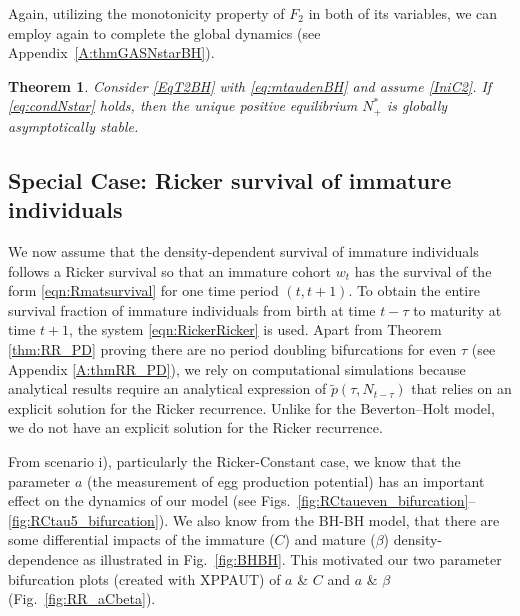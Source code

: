 \documentclass{article}
\newtheorem{theorem}{Theorem}
\numberwithin{theorem}{section}
\begin{document}
{Again, utilizing the monotonicity property of $F_{2}$ in both of its variables, we can employ again \cite[Theorem~1.15]{Ladas_2004} to complete the global dynamics (see Appendix~\ref{A:thmGASNstarBH}).

\begin{theorem}\label{thm:GASNstarBH}
      Consider \eqref{EqT2BH} with \eqref{eq:mtaudenBH} and assume \eqref{IniC2}. If \eqref{eq:condNstar} holds, then the unique positive equilibrium $N^*_+$ is globally asymptotically stable.
\end{theorem}

\subsection{Special Case: Ricker survival of immature individuals }

We now assume that the density-dependent survival of immature individuals follows a Ricker survival so that an immature cohort $w_t$ has the survival of the form \eqref{eqn:Rmatsurvival} for one time period $(t,t+1)$. To obtain the entire survival fraction of immature individuals from birth at time $t-\tau$ to maturity at time $t+1$, the system \eqref{eqn:RickerRicker} is used. Apart from Theorem \ref{thm:RR_PD} proving there are no period doubling bifurcations for even $\tau$ (see Appendix \ref{A:thmRR_PD}), we rely on computational simulations because analytical results require an analytical expression of $\widetilde{p}(\tau,N_{t-\tau})$ that relies on an explicit solution for the Ricker recurrence. Unlike for the Beverton--Holt model, we do not have an explicit solution for the Ricker recurrence. 

From scenario i), particularly the Ricker-Constant case, we know that the parameter $a$ (the measurement of egg production potential) has an important effect on the dynamics of our model (see Figs.~\ref{fig:RCtaueven_bifurcation}--\ref{fig:RCtau5_bifurcation}). We also know from the BH-BH model, that there are some differential impacts of the immature ($C$) and mature ($\beta$) density-dependence as illustrated in Fig.~\ref{fig:BHBH}. This motivated our two parameter bifurcation plots (created with XPPAUT) of $a$ \& $C$ and $a$ \& $\beta$ (Fig.~\ref{fig:RR_aCbeta}). 

}
\end{document}
